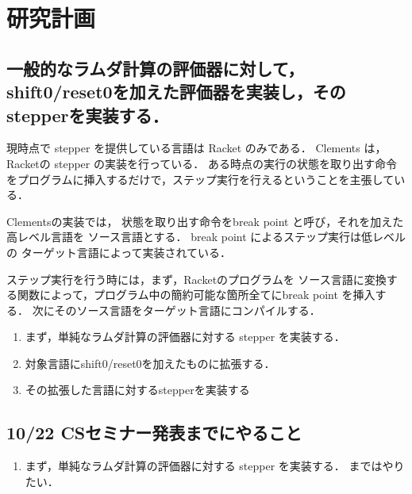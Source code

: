 \section{研究計画}\label{ux7814ux7a76ux8a08ux753b}

\subsection{一般的なラムダ計算の評価器に対して，shift0/reset0を加えた評価器を実装し，そのstepperを実装する．}\label{ux4e00ux822cux7684ux306aux30e9ux30e0ux30c0ux8a08ux7b97ux306eux8a55ux4fa1ux5668ux306bux5bfeux3057ux3066shift0reset0ux3092ux52a0ux3048ux305fux8a55ux4fa1ux5668ux3092ux5b9fux88c5ux3057ux305dux306estepperux3092ux5b9fux88c5ux3059ux308b}

現時点で stepper を提供している言語は Racket のみである． Clements
は，Racketの stepper の実装を行っている．
ある時点の実行の状態を取り出す命令をプログラムに挿入するだけで，ステップ実行を行えるということを主張している．

Clementsの実装では， 状態を取り出す命令をbreak point
と呼び，それを加えた高レベル言語を ソース言語とする． break point
によるステップ実行は低レベルの ターゲット言語によって実装されている．

ステップ実行を行う時には，まず，Racketのプログラムを
ソース言語に変換する関数によって，プログラム中の簡約可能な箇所全てにbreak
point を挿入する． 次にそのソース言語をターゲット言語にコンパイルする．

\begin{enumerate}
\def\labelenumi{\arabic{enumi}.}
\tightlist
\item
  まず，単純なラムダ計算の評価器に対する stepper を実装する．
\item
  対象言語にshift0/reset0を加えたものに拡張する．
\item
  その拡張した言語に対するstepperを実装する
\end{enumerate}

\subsection{10/22
CSセミナー発表までにやること}\label{csux30bbux30dfux30caux30fcux767aux8868ux307eux3067ux306bux3084ux308bux3053ux3068}

\begin{enumerate}
\def\labelenumi{\arabic{enumi}.}
\tightlist
\item
  まず，単純なラムダ計算の評価器に対する stepper を実装する．
  まではやりたい．
\end{enumerate}

